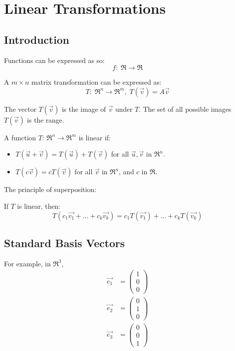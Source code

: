\section{Linear Transformations}
\subsection{Introduction}
Functions can be expressed as so:
\begin{equation}
    f: \; \Re \rightarrow \Re
\end{equation}

\noindent
A \(m \times n\) matrix transformation can be expressed as:
\begin{equation}
    T: \; \Re^n \rightarrow \Re^m, \; T(\vec{v}) = A \vec{v}
\end{equation}

\noindent
The vector \(T(\vec{v})\) is the image of \(\vec{v}\) under \(T\). The set of all possible images \(T(\vec{v})\) is the range.

\begin{definition}
    A function \(T\):  \(\Re^n\rightarrow\Re^m\) is linear if:
    \begin{itemize}
        \item \(T(\vec{u}+\vec{v}) = T(\vec{u}) + T(\vec{v})\) for all \(\vec{u}, \vec{v}\) in \(\Re^n\).
        \item \(T(c\vec{v}) = cT(\vec{v})\) for all \(\vec{v}\) in \(\Re^n\), and \(c\) in \(\Re\).
    \end{itemize}
\end{definition}

\begin{definition}
    The principle of superposition:
    
    If \(T\) is linear, then:
    \[T(c_1\Vec{v_1} + \dots + c_k \Vec{v_k}) = c_1 T(\vec{v_1}) + \dots + c_k T(\vec{v_k})\]
\end{definition}

\subsection{Standard Basis Vectors}
\noindent
For example, in \(\Re^3\),
\begin{align}
    \Vec{e_1} &= \begin{pmatrix}
        1 \\ 0 \\ 0
    \end{pmatrix} \\
    \Vec{e_2} &= \begin{pmatrix}
        0 \\ 1 \\ 0
    \end{pmatrix} \\
    \Vec{e_3} &= \begin{pmatrix}
        0 \\ 0 \\ 1
    \end{pmatrix}
\end{align}

